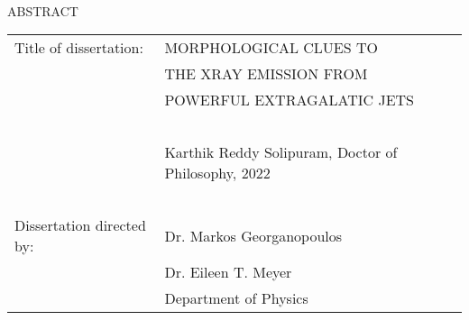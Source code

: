 
\hbox{\ }

\renewcommand{\baselinestretch}{1}
\small \normalsize

\begin{center}
\large{{ABSTRACT}} 

\vspace{3em} 

\end{center}
\hspace{-.15in}
\begin{tabular}{ll}
Title of dissertation:    & {\large  MORPHOLOGICAL CLUES TO }\\
&				      {\large  THE XRAY EMISSION FROM} \\
&				      {\large  POWERFUL EXTRAGALATIC JETS} \\
\ \\
&                          {\large  Karthik Reddy Solipuram, Doctor of Philosophy, 2022} \\
\ \\
Dissertation directed by: & {\large  Dr. Markos Georganopoulos} \\
& {\large Dr. Eileen T. Meyer}\\
&  				{\large	 Department of Physics } \\
\end{tabular}

\vspace{3em}

\renewcommand{\baselinestretch}{2}
\large \normalsize



